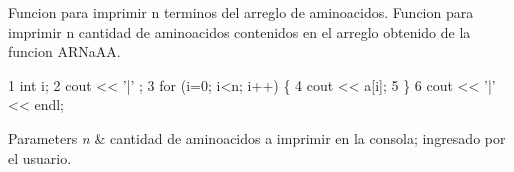 Funcion para imprimir n terminos del arreglo de aminoacidos. Funcion para imprimir n cantidad de aminoacidos contenidos en el arreglo obtenido de la funcion A\+R\+Na\+AA. 


\begin{DoxyCode}
1 int i;
2 cout << '|' ;
3 for (i=0; i<n; i++) \{
4     cout <<  a[i];
5 \}
6 cout << '|' << endl;
\end{DoxyCode}
 
\begin{DoxyParams}{Parameters}
{\em n} & cantidad de aminoacidos a imprimir en la consola; ingresado por el usuario. \\
\hline
\end{DoxyParams}
